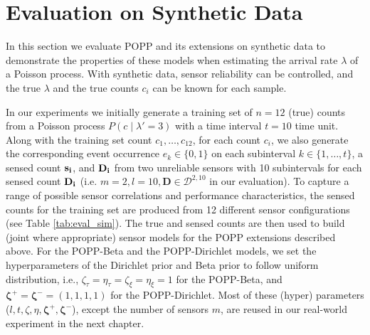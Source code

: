 
\section{Evaluation on Synthetic Data}
\label{sec:evasim}

In this section we evaluate POPP and its extensions on synthetic data to demonstrate the properties of these models when estimating the arrival rate $\lambda$ of a Poisson process. With synthetic data, sensor reliability can be controlled, and the true $\lambda$ and the true counts $c_i$ can be known for each sample.



In our experiments we initially generate a training set of $n=12$ (true) counts from a Poisson process $P(c \mid \lambda'=3)$ with a time interval $t = 10$ time unit. Along with the training set count $c_1, \ldots, c_{12}$, for each count $c_i$, we also generate the corresponding event occurrence $e_k \in \{0, 1\}$ on each subinterval $k \in \{1, \ldots, t\}$, a sensed count $\protect\mathbf{s_i}$, and $\protect\mathbf{D_i}$ from two unreliable sensors with 10 subintervals for each sensed count $\protect\mathbf{D_i}$ (i.e. $m=2, l=10, \mathbf{D} \in \mathcal D^{2, 10}$ in our evaluation). To capture a range of possible sensor correlations and performance characteristics, the sensed counts for the training set are produced from 12 different sensor configurations (see Table \ref{tab:eval_sim}). The true and sensed counts are then used to build (joint where appropriate) sensor models for the POPP extensions described above. For the POPP-Beta and the POPP-Dirichlet models, we set the hyperparameters of the Dirichlet prior and Beta prior to follow uniform distribution, i.e., $\zeta_{\tau} = \eta_{\tau} = \zeta_{\xi} = \eta_{\xi} = 1$ for the POPP-Beta, and $\boldsymbol{\zeta^+} = \boldsymbol{\zeta^-} = (1, 1, 1, 1)$ for the POPP-Dirichlet. Most of these (hyper) parameters ($l, t, \zeta, \eta, \boldsymbol{\zeta^+}, \boldsymbol{\zeta^-}$), except the number of sensors $m$, are reused in our real-world experiment in the next chapter.

